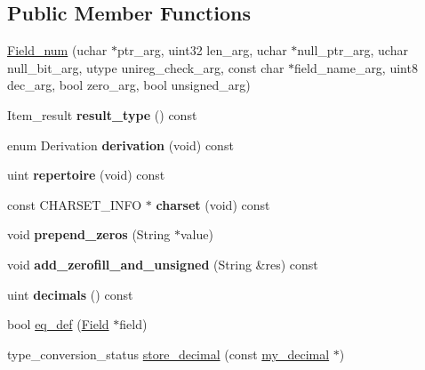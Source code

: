\subsection*{Public Member Functions}
\begin{DoxyCompactItemize}
\item 
\mbox{\hyperlink{classField__num_a7f74cee006e7ebcde71d71105bd66ec8}{Field\+\_\+num}} (uchar $\ast$ptr\+\_\+arg, uint32 len\+\_\+arg, uchar $\ast$null\+\_\+ptr\+\_\+arg, uchar null\+\_\+bit\+\_\+arg, utype unireg\+\_\+check\+\_\+arg, const char $\ast$field\+\_\+name\+\_\+arg, uint8 dec\+\_\+arg, bool zero\+\_\+arg, bool unsigned\+\_\+arg)
\item 
\mbox{\label{classField__num_ace826285304f066148667f064847ca6b}} 
Item\+\_\+result {\bfseries result\+\_\+type} () const
\item 
\mbox{\label{classField__num_a762c349d1c20392705e54a4b54476450}} 
enum Derivation {\bfseries derivation} (void) const
\item 
\mbox{\label{classField__num_aa0fb24da13b3fd4a6f7d8f38d29904f1}} 
uint {\bfseries repertoire} (void) const
\item 
\mbox{\label{classField__num_a18d0ee588d43b95b523fdd67c8693bdf}} 
const C\+H\+A\+R\+S\+E\+T\+\_\+\+I\+N\+FO $\ast$ {\bfseries charset} (void) const
\item 
\mbox{\label{classField__num_a69e6de031a118d916aff66ecf487664d}} 
void {\bfseries prepend\+\_\+zeros} (String $\ast$value)
\item 
\mbox{\label{classField__num_ac5f0d222ce9492062dd9255a82567741}} 
void {\bfseries add\+\_\+zerofill\+\_\+and\+\_\+unsigned} (String \&res) const
\item 
\mbox{\label{classField__num_a4a0355718fdea279ca9ab5c1be375c9f}} 
uint {\bfseries decimals} () const
\item 
bool \mbox{\hyperlink{classField__num_a085c650230d92d4a6a2edc8891b79347}{eq\+\_\+def}} (\mbox{\hyperlink{classField}{Field}} $\ast$field)
\item 
type\+\_\+conversion\+\_\+status \mbox{\hyperlink{classField__num_a66573c9ffc227799320c49a73a0f8de5}{store\+\_\+decimal}} (const \mbox{\hyperlink{classmy__decimal}{my\+\_\+decimal}} $\ast$)

\end{DoxyCompactItemize}

